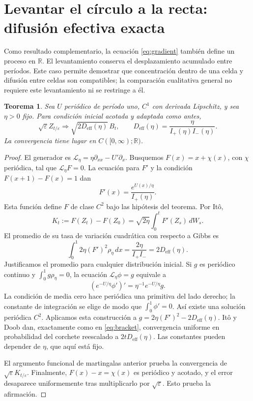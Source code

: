 \documentclass[11pt,a4paper]{article}
\newtheorem{theorem}{Teorema}
\theoremstyle{remark}\newtheorem{remark}{Observación}
\newcommand{\R}{\mathbb R}
\newcommand{\Deff}{D_{\mathrm{eff}}}
\begin{document}
\section{Levantar el círculo a la recta: difusión efectiva exacta}
Como resultado complementario, la ecuación \eqref{eq:gradient} también define un proceso en $\R$. El levantamiento conserva el desplazamiento acumulado entre períodos. Este caso permite demostrar que concentración dentro de una celda y difusión entre celdas son compatibles; la comparación cualitativa general no requiere este levantamiento ni se restringe a él.

\begin{theorem}\label{thm:potential}
Sea $U$ periódico de período uno, $C^1$ con derivada Lipschitz, y sea $\eta>0$ fijo. Para condición inicial acotada y adaptada como antes,
\[
 \sqrt\varepsilon Z_{t/\varepsilon}
 \Longrightarrow\sqrt{2\Deff(\eta)}\,B_t,
 \qquad
 \Deff(\eta)=\frac{\eta}{I_+(\eta)I_-(\eta)}.
\]
La convergencia tiene lugar en $C([0,\infty);\R)$.
\end{theorem}
\begin{proof}
El generador es $\mathcal L_\eta=\eta\partial_{xx}-U'\partial_x$. Busquemos $F(x)=x+\chi(x)$, con $\chi$ periódica, tal que $\mathcal L_\eta F=0$. La ecuación para $F'$ y la condición $F(x+1)-F(x)=1$ dan
\[
 F'(x)=\frac{e^{U(x)/\eta}}{I_+(\eta)}.
\]
Esta función define $F$ de clase $C^2$ bajo las hipótesis del teorema. Por Itô,
\[
 K_t:=F(Z_t)-F(Z_0)
 =\sqrt{2\eta}\int_0^tF'(Z_s)\,dW_s.
\]
El promedio de su tasa de variación cuadrática con respecto a Gibbs es
\begin{equation}\label{eq:potentialvariance}
 \int_0^1 2\eta(F')^2\rho_\eta\,dx
 =\frac{2\eta}{I_+I_-}=2\Deff(\eta).
\end{equation}
Justificamos el promedio para cualquier distribución inicial. Si $g$ es periódico continuo y $\int_0^1g\rho_\eta=0$, la ecuación $\mathcal L_\eta\phi=g$ equivale a
\[
 (e^{-U/\eta}\phi')'=\eta^{-1}e^{-U/\eta}g.
\]
La condición de media cero hace periódica una primitiva del lado derecho; la constante de integración se elige de modo que $\int_0^1\phi'=0$. Así existe una solución periódica $C^2$. Aplicamos esta construcción a $g=2\eta(F')^2-2\Deff(\eta)$. Itô y Doob dan, exactamente como en \eqref{eq:bracket}, convergencia uniforme en probabilidad del corchete reescalado a $2t\Deff(\eta)$. Las constantes pueden depender de $\eta$, que aquí está fijo.

El argumento funcional de martingalas anterior prueba la convergencia de $\sqrt\varepsilon K_{t/\varepsilon}$. Finalmente, $F(x)-x=\chi(x)$ es periódico y acotado, y el error desaparece uniformemente tras multiplicarlo por $\sqrt\varepsilon$. Esto prueba la afirmación.
\end{proof}
\end{document}
